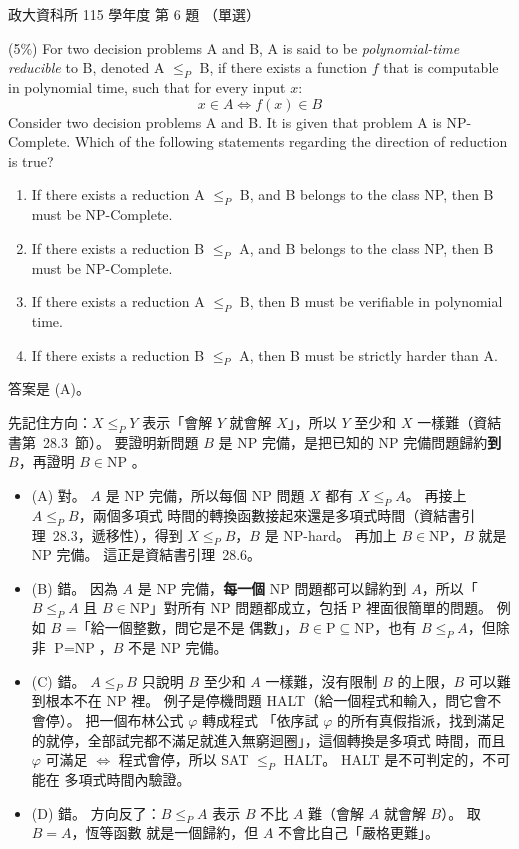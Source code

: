 \begin{pastexam}[label={px:nccu-115-dsa-06}]{政大資科所 115 學年度 第 6 題}
（單選）

(5\%) For two decision problems A and B, A is said to be \textit{polynomial-time reducible} to B, denoted
A $\le_P$ B, if there exists a function $f$ that is computable in polynomial time, such that for every
input $x$:
\[ x\in A \Leftrightarrow f(x)\in B \]
Consider two decision problems A and B. It is given that problem A is NP-Complete. Which of the
following statements regarding the direction of reduction is true?
\begin{enumerate}[label=(\Alph*)]
\item If there exists a reduction A $\le_P$ B, and B belongs to the class NP, then B must be NP-Complete.
\item If there exists a reduction B $\le_P$ A, and B belongs to the class NP, then B must be NP-Complete.
\item If there exists a reduction A $\le_P$ B, then B must be verifiable in polynomial time.
\item If there exists a reduction B $\le_P$ A, then B must be strictly harder than A.
\end{enumerate}
\end{pastexam}

\begin{pastsoln}
答案是 (A)。

先記住方向：$X \le_P Y$ 表示「會解 $Y$ 就會解 $X$」，所以 $Y$ 至少和 $X$ 一樣難（資結書第~28.3~節）。
要證明新問題 $B$ 是 NP 完備，是把已知的 NP 完備問題歸約\textbf{到} $B$，再證明 $B \in \text{NP}$
。

\begin{itemize}
\item (A) 對。 $A$ 是 NP 完備，所以每個 NP 問題 $X$ 都有 $X \le_P A$。 再接上 $A \le_P B$，兩個多項式
時間的轉換函數接起來還是多項式時間（資結書引理~28.3，遞移性），得到 $X \le_P B$，$B$ 是 NP-hard。
再加上 $B \in \text{NP}$，$B$ 就是 NP 完備。 這正是資結書引理~28.6。
\item (B) 錯。 因為 $A$ 是 NP 完備，\textbf{每一個} NP 問題都可以歸約到 $A$，所以「$B \le_P A$ 且
$B \in \text{NP}$」對所有 NP 問題都成立，包括 P 裡面很簡單的問題。 例如 $B$ =「給一個整數，問它是不是
偶數」，$B \in \text{P} \subseteq \text{NP}$，也有 $B \le_P A$，但除非 $\text{P} = \text{NP}$，$B$
不是 NP 完備。
\item (C) 錯。 $A \le_P B$ 只說明 $B$ 至少和 $A$ 一樣難，沒有限制 $B$ 的上限，$B$ 可以難到根本不在 NP
裡。 例子是停機問題 HALT（給一個程式和輸入，問它會不會停）。 把一個布林公式 $\varphi$ 轉成程式
「依序試 $\varphi$ 的所有真假指派，找到滿足的就停，全部試完都不滿足就進入無窮迴圈」，這個轉換是多項式
時間，而且 $\varphi$ 可滿足 $\iff$ 程式會停，所以 SAT $\le_P$ HALT。 HALT 是不可判定的，不可能在
多項式時間內驗證。
\item (D) 錯。 方向反了：$B \le_P A$ 表示 $B$ 不比 $A$ 難（會解 $A$ 就會解 $B$）。 取 $B = A$，恆等函數
就是一個歸約，但 $A$ 不會比自己「嚴格更難」。
\end{itemize}
\end{pastsoln}
